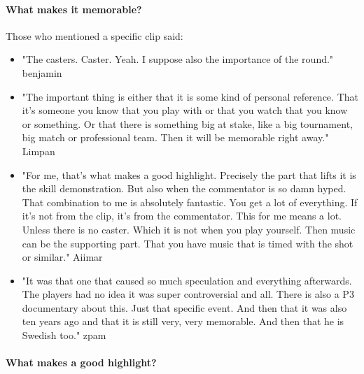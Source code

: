 \paragraph{What makes it memorable?}
Those who mentioned a specific clip said:
\begin{itemize}
    \item "The casters. Caster. Yeah. I suppose also the importance of the round." {benjamin}
    \item "The important thing is either that it is some kind of personal reference. That it's someone you know that you play with or that you watch that you know or something. Or that there is something big at stake, like a big tournament, big match or professional team. Then it will be memorable right away." {Limpan}
    \item "For me, that's what makes a good highlight. Precisely the part that lifts it is the skill demonstration. But also when the commentator is so damn hyped. That combination to me is absolutely fantastic. You get a lot of everything. If it's not from the clip, it's from the commentator. This for me means a lot. Unless there is no caster. Which it is not when you play yourself. Then music can be the supporting part. That you have music that is timed with the shot or similar." {Aiimar}
    \item "It was that one that caused so much speculation and everything afterwards. The players had no idea it was super controversial and all. There is also a P3 documentary about this. Just that specific event. And then that it was also ten years ago and that it is still very, very memorable. And then that he is Swedish too." {zpam}
\end{itemize}
\paragraph{What makes a good highlight?}

